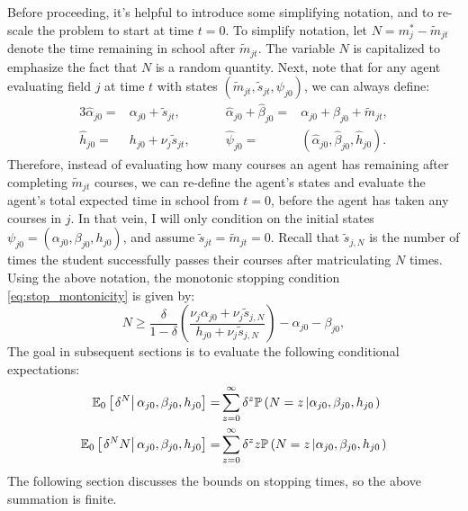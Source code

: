 \documentclass[11 pt]{article}
\newcommand{\pr}[1]{\left( #1 \right)}
\newcommand{\ce}[2]{\left[\left. #1 \right\vert #2 \right]}
\newcommand{\crs}[2]{#1 \left\vert #2 \right.}
\newcommand{\study}{m} %
\newcommand{\pass}{s}
\newcommand{\pstates}{\tilde{\study}_{jt}, \tilde{\pass}_{jt}, \psi_{j0}}
\newcommand*{\ks}[1][t]{\tilde{\pass}_{j #1}}
\begin{document}
Before proceeding, it's helpful to introduce some simplifying notation, and to re-scale the problem to start at time $t=0$. 
To simplify notation, let $N = \study_j^* - \tilde{\study}_{jt}$ denote the time remaining in school after $\tilde{\study}_{jt}$.
The variable $N$ is capitalized to emphasize the fact that $N$ is a random quantity. 
Next, note that for any agent evaluating field $j$ at time $t$ with states $\pr{\pstates}$, we can always define:
\begin{alignat*}{3}
    \hat{\alpha}_{j0} =& \alpha_{j0} + \tilde{\pass}_{jt},
    \quad \quad
    &\hat{\alpha}_{j0} + \hat{\beta}_{j0} 
    =& \alpha_{j0} + \beta_{j0} + \tilde{\study}_{jt},
    \\
    \hat{h}_{j0} 
    =& h_{j0} + \nu_j \tilde{\pass}_{jt}, 
    \quad \quad
    &\hat{\psi}_{j0} 
    =& 
    \pr{\hat{\alpha}_{j0}, \hat{\beta}_{j0}, \hat{h}_{j0}}.
\end{alignat*}
Therefore, instead of evaluating how many courses an agent has remaining after completing $\tilde{\study}_{jt}$ courses, we can re-define the agent's states and evaluate the agent's total expected time in school from $t=0$, before the agent has taken any courses in $j$.
In that vein, I will only condition on the initial states $\psi_{j0} = \pr{\alpha_{j0}, \beta_{j0}, h_{j0}}$, and assume $\tilde{\pass}_{jt} = \tilde{\study}_{jt} = 0$.
Recall that $\ks[,N]$ is the number of times the student successfully passes their courses after matriculating $N$ times. 
Using the above notation, the monotonic stopping condition \eqref{eq:stop_montonicity} is given by:
\begin{equation}\label{eq:stop_monotonicity_re_scaled}
    N \geq \frac{\delta}{1 - \delta}
    \pr{
        \frac{\nu_j \alpha_{j0} + \nu_j \ks[,N]}{h_{j0} + \nu_j \ks[,N]}
    } - \alpha_{j0} - \beta_{j0},
\end{equation}
The goal in subsequent sections is to evaluate the following conditional expectations:
\begin{align}    
    \nonumber
    \EE_0 \ce{\delta^N}{\alpha_{j0}, \beta_{j0}, h_{j0}}
    =&
    \sum_{z = 0}^\infty
    \delta^z
    \PP
    \pr{\crs{
        N = z
    }{\alpha_{j0}, \beta_{j0}, h_{j0}}}
    \\
    \label{eq:index_ce_n}
    \EE_0 \ce{\delta^N N}{\alpha_{j0}, \beta_{j0}, h_{j0}}
    =&
    \sum_{z = 0}^\infty
    \delta^z z
    \PP
    \pr{\crs{
        N = z
    }{\alpha_{j0}, \beta_{j0}, h_{j0}}}
\end{align}
The following section discusses the bounds on stopping times, so the above summation is finite.  
\end{document}
